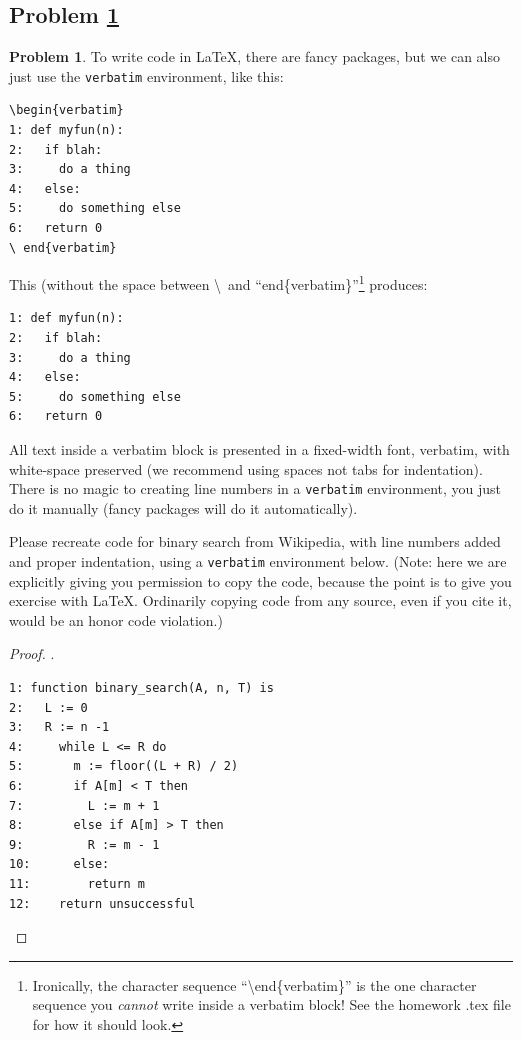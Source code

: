 \documentclass[11pt]{article}
\theoremstyle{definition}
\theoremstyle{definition}
\newtheorem{required}{Problem}
\theoremstyle{definition}
\begin{document}
\subsection{Problem \ref{LatexCode}}
\begin{required} \label{LatexCode}
To write code in LaTeX, there are fancy packages, but we can also just use the \texttt{verbatim} environment, like this:
\begin{verbatim}
\begin{verbatim}
1: def myfun(n):
2:   if blah:
3:     do a thing
4:   else:
5:     do something else
6:   return 0
\ end{verbatim} 
\end{verbatim}
This (without the space between \textbackslash\ and ``end\{verbatim\}''\footnote{Ironically, the character sequence ``\textbackslash end\{verbatim\}'' is the one character sequence you \emph{cannot} write inside a verbatim block! See the homework .tex file for how it should look.} produces:
\begin{verbatim}
1: def myfun(n):
2:   if blah:
3:     do a thing
4:   else:
5:     do something else
6:   return 0
\end{verbatim}
All text inside a verbatim block is presented in a fixed-width font, verbatim, with white-space preserved (we recommend using spaces not tabs for indentation). There is no magic to creating line numbers in a \texttt{verbatim} environment, you just do it manually (fancy packages will do it automatically). 

Please recreate code for binary search from Wikipedia, with line numbers added and proper indentation, using a \texttt{verbatim} environment below. (Note: here we are explicitly giving you permission to copy the code, because the point is to give you exercise with LaTeX. Ordinarily copying code from any source, even if you cite it, would be an honor code violation.)


\begin{proof}
.
\begin{verbatim}
1: function binary_search(A, n, T) is
2:   L := 0
3:   R := n -1
4:     while L <= R do
5:       m := floor((L + R) / 2)
6:       if A[m] < T then
7:         L := m + 1
8:       else if A[m] > T then
9:         R := m - 1
10:      else:
11:        return m
12:    return unsuccessful
\end{verbatim}
\end{proof}
\end{required}

\newpage
\end{document}
